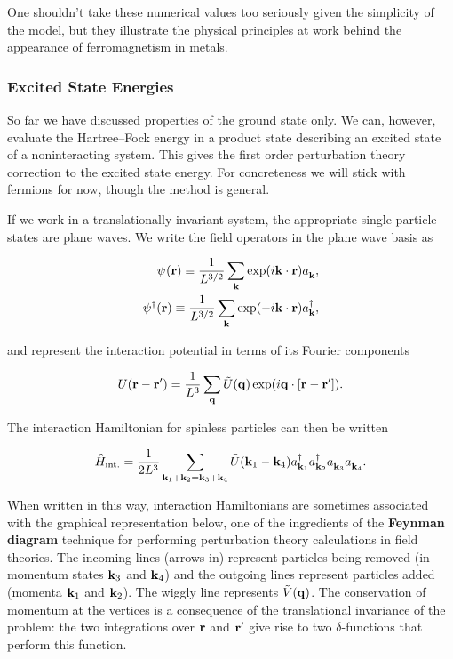 One shouldn't take these numerical values too seriously given the
simplicity of the model, but they illustrate the physical principles at
work behind the appearance of ferromagnetism in metals.

\hypertarget{excited-state-energies}{%
\subsubsection{Excited State Energies}\label{excited-state-energies}}

So far we have discussed properties of the ground state only. We can,
however, evaluate the Hartree--Fock energy in a product state describing
an excited state of a noninteracting system. This gives the first order
perturbation theory correction to the excited state energy. For
concreteness we will stick with fermions for now, though the method is
general.

If we work in a translationally invariant system, the appropriate single
particle states are plane waves. We write the field operators in the
plane wave basis as

\[
\begin{align}
    \pop(\br)\equiv\frac{1}{L^{3/2}}\sum_{\bk} \exp(i\bk\cdot\br)\aop_{\bk},\nonumber\\
  \pdop(\br)\equiv\frac{1}{L^{3/2}}\sum_{\bk} \exp(-i\bk\cdot\br)\adop_{\bk},
\end{align}
\]

and represent the interaction potential in terms of its Fourier
components

\[
U(\mathbf{r}-\mathbf{r}') = \frac{1}{L^3}\sum_{\mathbf{q}} \tilde U(\mathbf{q}) \exp(i\mathbf{q}\cdot[\mathbf{r}-\mathbf{r}']).
\]

The interaction Hamiltonian for spinless particles can then be written

\[
\hat H_\text{int.}  = \frac{1}{2L^3} \sum_{\bk_1+\bk_2=\bk_3+\bk_4} \tilde U(\bk_1-\bk_4) \adop_{\bk_1}\adop_{\bk_2}\aop_{\bk_3}\aop_{\bk_4}.
\label{more_vertex}
\]

When written in this way, interaction Hamiltonians are sometimes
associated with the graphical representation below, one of the
ingredients of the \textbf{Feynman diagram} technique for performing
perturbation theory calculations in field theories. The incoming lines
(arrows in) represent particles being removed (in momentum states
\(\mathbf{k}_3\) and \(\mathbf{k}_4\)) and the outgoing lines represent particles
added (momenta \(\mathbf{k}_1\) and \(\mathbf{k}_2\)). The wiggly line represents
\(\tilde V(\mathbf{q})\). The conservation of momentum at the vertices is a
consequence of the translational invariance of the problem: the two
integrations over \(\mathbf{r}\) and \(\mathbf{r}'\) give rise to two
\(\delta\)-functions that perform this function.

